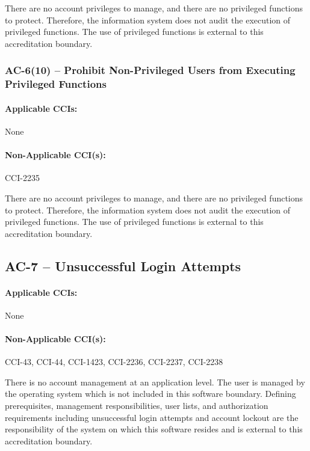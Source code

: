 \documentclass[letterpaper, 10pt, twoside]{article}
\begin{document}
There are no account privileges to manage, and there are no privileged functions to protect. Therefore, the information system does not audit the execution of privileged functions. The use of privileged functions is external to this accreditation boundary.

\subsubsection{AC-6(10) -- Prohibit Non-Privileged Users from Executing Privileged Functions}

\paragraph{Applicable CCIs:} None

\paragraph{Non-Applicable CCI(s):} CCI-2235

There are no account privileges to manage, and there are no privileged functions to protect. Therefore, the information system does not audit the execution of privileged functions. The use of privileged functions is external to this accreditation boundary.

\subsection{AC-7 -- Unsuccessful Login Attempts}

\paragraph{Applicable CCIs:} None

\paragraph{Non-Applicable CCI(s):} CCI-43, CCI-44, CCI-1423, CCI-2236, CCI-2237, CCI-2238

There is no account management at an application level. The user is managed by the operating system which is not included in this software boundary. Defining prerequisites, management responsibilities, user lists, and authorization requirements including unsuccessful login attempts and account lockout are the responsibility of the system on which this software resides and is external to this accreditation boundary.
\end{document}
